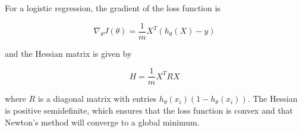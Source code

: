 \documentclass[conference]{IEEEtran}
\begin{document}
For a logistic regression, the gradient of the loss function is

\begin{equation}
    \nabla_\theta J(\theta) = \frac{1}{m} X^T (h_\theta(X) - y)
    \label{eq:gradient}
\end{equation}

and the Hessian matrix is given by

\begin{equation}
    H = \frac{1}{m} X^T R X
    \label{eq:hessian}
\end{equation}

where \( R \) is a diagonal matrix with entries \( h_\theta(x_i)(1 - h_\theta(x_i)) \). The Hessian is positive semidefinite, which ensures that the loss function is convex and that Newton's method will converge to a global minimum.


\end{document}
